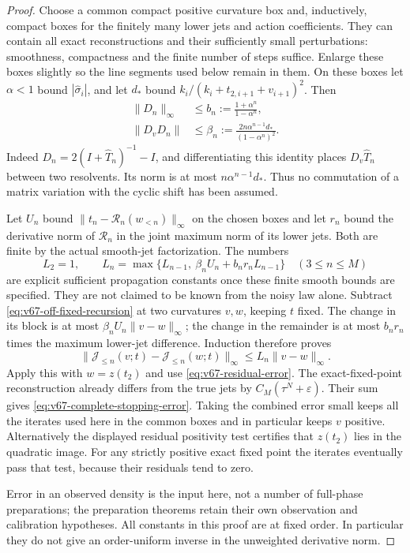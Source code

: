 \begin{proof}
Choose a common compact positive curvature box and, inductively, compact
boxes for the finitely many lower jets and action coefficients.  They
can contain all exact reconstructions and their sufficiently small
perturbations: smoothness, compactness and the finite number of steps
suffice.  Enlarge these boxes slightly so the line segments used below
remain in them.  On these boxes let $\alpha<1$ bound
$|\widehat\sigma_i|$, and let $d_*$ bound
$k_i/(k_i+t_{2,i+1}+v_{i+1})^2$.  Then
\begin{equation}\label{eq:v67-block-lipschitz}
 \begin{split}
 \|D_n\|_\infty&\le b_n:=\frac{1+\alpha^n}{1-\alpha^n},\\
 \|D_vD_n\|&\le\beta_n:=
            \frac{2n\alpha^{n-1}d_*}{(1-\alpha^n)^2}.
 \end{split}
\end{equation}
Indeed $D_n=2(I+\widehat T_n)^{-1}-I$, and differentiating this
identity places $D_v\widehat T_n$ between two resolvents.  Its norm
is at most $n\alpha^{n-1}d_*$.  Thus no commutation of a matrix
variation with the cyclic shift has been assumed.

Let $U_n$ bound $\|t_n-\mathcal R_n(w_{<n})\|_\infty$ on the
chosen boxes and let $r_n$ bound the derivative norm of
$\mathcal R_n$ in the joint maximum norm of its lower jets.  Both are
finite by the actual smooth-jet factorization.  The numbers
\begin{equation}\label{eq:v67-propagation-constants}
 L_2=1,\qquad
 L_n=\max\{L_{n-1},\ \beta_nU_n+b_n r_nL_{n-1}\}
                    \quad(3\le n\le M)
\end{equation}
are explicit sufficient propagation constants once these finite smooth
bounds are specified.  They are not claimed to be known from the noisy
law alone.  Subtract \eqref{eq:v67-off-fixed-recursion} at two
curvatures $v,w$, keeping $t$ fixed.  The change in its block is at
most $\beta_nU_n\|v-w\|_\infty$; the change in the remainder
is at most $b_n r_n$ times the maximum lower-jet difference.
Induction therefore proves
\[
 \|\mathcal J_{\le n}(v;t)-\mathcal J_{\le n}(w;t)\|_\infty
                  \le L_n\|v-w\|_\infty.
\]
Apply this with $w=z(t_2)$ and use
\eqref{eq:v67-residual-error}.  The exact-fixed-point reconstruction
already differs from the true jets by
$C_M(\tau^N+\varepsilon)$.  Their sum gives
\eqref{eq:v67-complete-stopping-error}.  Taking the combined error
small keeps all the iterates used here in the common boxes and in
particular keeps $v$ positive.  Alternatively the displayed residual
positivity test certifies that $z(t_2)$ lies in the quadratic image.
For any strictly positive exact fixed point the iterates eventually
pass that test, because their residuals tend to zero.

Error in an observed density is the input here, not a number of
full-phase preparations; the preparation theorems retain their own
observation and calibration hypotheses.  All constants in this proof
are at fixed order.  In particular they do not give an order-uniform
inverse in the unweighted derivative norm.
\end{proof}
